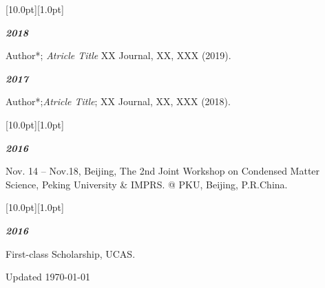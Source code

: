 \documentclass[12pt,a4paper,utf8]{report}
\begin{document}
\begin{minipage}[t]{16cm}
    \colorbox{subtitlecolor}{\raisebox{0pt}[10.0pt][1.0pt]{
        \textcolor{white}{\textsf{}}}}
\end{minipage}\par
\vspace{0.2cm}\hspace{0.5cm}
\begin{minipage}[t]{15cm}
    {\textbf{\em{2018}}}\par
    \quad Author*; {\em{Atricle Title}} XX Journal, XX, XXX (2019).\par
    \vspace{0.2cm}
    {\textbf{\em{2017}}}\par
    \quad Author*;{\em{Atricle Title}}; XX Journal, XX, XXX (2018).\par
\end{minipage}\par
\vspace{0.4cm}

\begin{minipage}[t]{16cm}
    \colorbox{subtitlecolor}{\raisebox{0pt}[10.0pt][1.0pt]{
        \textcolor{white}{\textsf{}}}}
\end{minipage}\par
\vspace{0.2cm}\hspace{0.5cm}
\begin{minipage}[t]{15cm}
    {\textbf{\em{2016}}}\par
    \quad Nov. 14 -- Nov.18, Beijing, The 2nd Joint Workshop on Condensed Matter Science, Peking University \& IMPRS. @ PKU, Beijing, P.R.China.\par
    \vspace{0.2cm}
\end{minipage}\par
\vspace{0.4cm}

\begin{minipage}[t]{16cm}
    \colorbox{subtitlecolor}{\raisebox{0pt}[10.0pt][1.0pt]{
        \textcolor{white}{\textsf{}}}}
\end{minipage}\par
\vspace{0.2cm}\hspace{0.5cm}
\begin{minipage}[t]{15cm}
    {\textbf{\em{2016}}}\par
    \quad First-class Scholarship, UCAS.\par
    \vspace{0.2cm}
\end{minipage}\par
\vspace{0.4cm}

\begin{center}\vspace{1.0cm}
    Updated \monthyeardate\today
\end{center}
\end{document}

